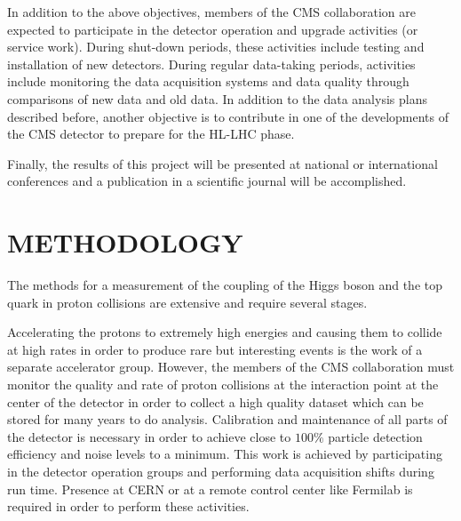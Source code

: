 \documentclass[final,3p]{CSP}
\begin{document}
In addition to the above objectives, members of the CMS collaboration are expected to participate in the detector operation and upgrade activities (or service work).
During shut-down periods, these activities include testing and installation of new detectors.
During regular data-taking periods, activities include monitoring the data acquisition systems and data quality through comparisons of new data and old data.
In addition to the data analysis plans described before, another objective is to contribute in one of the developments of the CMS detector to  prepare for the HL-LHC phase.
%

Finally, the results of this project will be presented at national or international conferences and a publication in a scientific journal will be accomplished.


\section{METHODOLOGY}





\onehalfspacing The methods for a measurement of the coupling of the Higgs boson and the top quark in proton collisions are extensive and require several stages.

Accelerating the protons to extremely high energies and causing them to collide at high rates in order to produce rare but interesting events is the work of a separate accelerator group.
However, the members of the CMS collaboration must monitor the quality and rate of proton collisions at the interaction point at the center of the detector in order to collect a high quality dataset which can be stored for many years to do analysis.
Calibration and maintenance of all parts of the detector is necessary in order to achieve close to $100\%$ particle detection efficiency and noise levels to a minimum. This work is achieved by participating in the detector operation groups and performing data acquisition shifts during run time.  
Presence at CERN or at a remote control center like Fermilab is required in order to perform these activities. 
\end{document}
